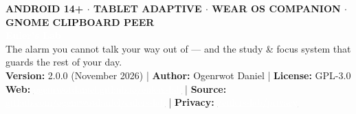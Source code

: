 \documentclass[11pt,a4paper]{article}
\begin{document}
\color{wpink}

\thispagestyle{empty}
\begin{heroheader}
  {\sffamily\scriptsize\bfseries\textcolor{wpteal}{ANDROID 14+ $\cdot$ TABLET ADAPTIVE $\cdot$ WEAR OS COMPANION $\cdot$ GNOME CLIPBOARD PEER}}\\[6pt]
  {\sffamily\Huge\bfseries\textcolor{white}{Euler's Lab}}\\[4pt]
  {\sffamily\large\textcolor{white!92}{The alarm you cannot talk your way out of --- and the study \& focus system that guards the rest of your day.}}\\[10pt]
  {\sffamily\small\textcolor{white!80}{%
    \textbf{Version:} 2.0.0 (November 2026) \quad|\quad
    \textbf{Author:} Ogenrwot Daniel \quad|\quad
    \textbf{License:} GPL-3.0\\[3pt]
    \textbf{Web:} \href{https://ogenrwotdaniel.github.io/eulers-lab/}{\textcolor{white}{\underline{ogenrwotdaniel.github.io/eulers-lab}}} \quad|\quad
    \textbf{Source:} \href{https://github.com/ogenrwotdaniel/eulers-lab}{\textcolor{white}{\underline{github.com/ogenrwotdaniel/eulers-lab}}} \quad|\quad
    \textbf{Privacy:} \href{https://ogenrwotdaniel.github.io/eulers-lab/privacy/}{\textcolor{white}{\underline{/eulers-lab/privacy}}}%
  }}
\end{heroheader}

\vspace{6pt}
\end{document}
